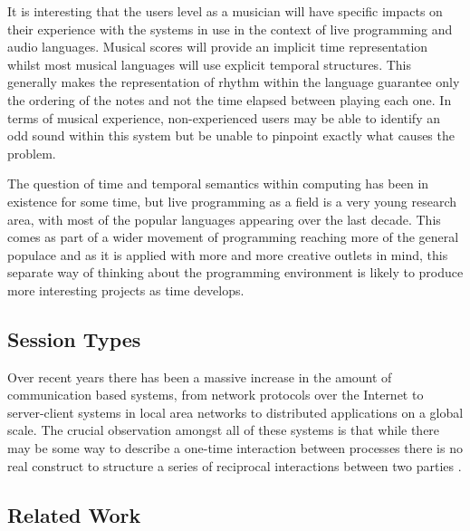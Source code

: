 \documentclass[11pt]{scrartcl}
\begin{document}
It is interesting that the users level as a musician will have specific 
impacts on their experience with the systems in use in the context of live 
programming and audio languages. Musical scores will provide an implicit time 
representation whilst most musical languages will use explicit temporal 
structures. This generally makes the representation of rhythm within the 
language guarantee only the ordering of the notes and not the time elapsed 
between playing each one. In terms of musical experience, non-experienced 
users may be able to identify an odd sound within this system but be unable to 
pinpoint exactly what causes the problem. 

The question of time and temporal semantics within computing has been in 
existence for some time, but live programming as a field is a very young 
research area, with most of the popular languages appearing over the last 
decade. This comes as part of a wider movement of programming reaching more of 
the general populace and as it is applied with more and more creative outlets 
in mind, this separate way of thinking about the programming environment is 
likely to produce more interesting projects as time develops.

\subsection{Session Types}
Over recent years there has been a massive increase in the amount of communication based systems, from network protocols over the Internet to server-client systems in local area networks to distributed applications on a global scale. The crucial observation amongst all of these systems is that while there may be some way to describe a one-time interaction between processes there is no real construct to structure a series of reciprocal interactions between two parties \cite{}.


\subsection{Related Work}
\end{document}
